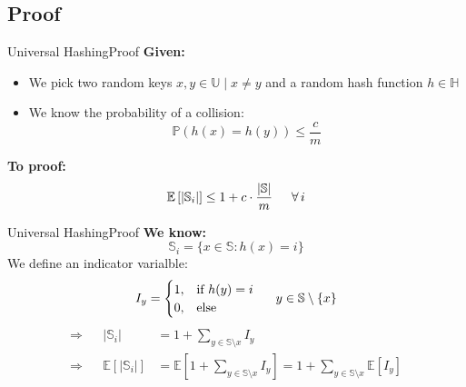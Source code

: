 \subsection{Proof}

\begin{frame}{Universal Hashing}{Proof}
  \textbf{Given:}
  \begin{itemize}
    \item
      We pick two random keys $x, y \in \mathbb{U} \mid x \neq y$ and
      a random hash function $h \in \mathbb{H}$
    \item
      We know the probability of a collision:
      \[\mathbb{P}(h(x) = h(y)) \leq \frac{c}{m}\]
  \end{itemize}
  \textbf{To proof:}
  \[\mathbb{E}\left[\vert \mathbb{S}_i \vert\right]
     \leq 1 + c \cdot \frac{\vert \mathbb{S} \vert}{m}
     \hspace*{1.5em} \forall \, i\]
\end{frame}


\begin{frame}{Universal Hashing}{Proof}
  \textbf{We know:}
  \[\mathbb{S}_i = \{x \in \mathbb{S}: h(x) = i\}\]
  We define an indicator varialble:
  \begin{displaymath}
    I_y = \begin{cases}
      1, & \text{if } h(y) = i\\
      0, & \text{else}
    \end{cases} \hspace*{1.5em} y \in \mathbb{S} \setminus \{x\}
  \end{displaymath}
  \begin{align*}
    \Rightarrow && \vert \mathbb{S}_i \vert
      & = 1 + \sum_{y \in \mathbb{S} \setminus x} I_y\\
    \Rightarrow && \mathbb{E}\left[\vert \mathbb{S}_i \vert\right]
      & = \mathbb{E}\left[1 + \sum_{y \in \mathbb{S} \setminus x} I_y\right]
        = 1 + \sum_{y \in \mathbb{S} \setminus x} \mathbb{E}[I_y]
  \end{align*}
\end{frame}


